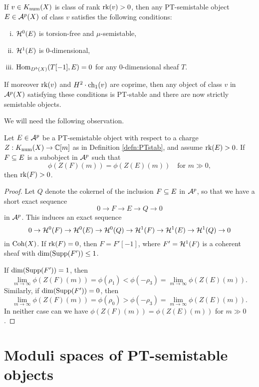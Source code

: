 \begin{prop}
    If $v \in K_{\mathrm{num}}(X)$ is class of rank $\operatorname{\mathrm{rk}}(v) > 0$, then any PT-semistable object $E \in \mathcal{A}^p(X)$ of class $v$ satisfies the following conditions:
    \begin{enumerate}[(i)]
        \item $\mathcal{H}^0(E)$ is torsion-free and $\mu$-semistable,
        \item $\mathcal{H}^1(E)$ is 0-dimensional,
        \item $\mathrm{Hom}_{D^b(X)}(T[-1], E) = 0$ for any 0-dimensional sheaf $T$.
    \end{enumerate}
    If moreover $\operatorname{\mathrm{rk}}(v)$ and $H^2 \cdot \operatorname{\mathrm{ch}}_1(v)$ are coprime, then any object of class $v$ in $\mathcal{A}^p(X)$ satisfying these conditions is PT-stable and there are now strictly semistable objects.
\end{prop}
We will need the following observation.
\begin{lem}\label{subobjposrank}
    Let $E \in \mathcal{A}^p$ be a PT-semistable object with respect to a charge $Z: K_{\mathrm{num}}(X) \to \mathbb{C}[m]$ as in Definition \ref{defn:PTstab}, and assume $\operatorname{\mathrm{rk}}(E) > 0$. If $F \subseteq E$ is a subobject in $\mathcal{A}^p$ such that 
    \[ \phi(Z(F)(m)) = \phi(Z(E)(m)) \quad \text{for } m \gg 0, \]
    then $\operatorname{\mathrm{rk}}(F) > 0$.
\end{lem}
\begin{proof}
    Let $Q$ denote the cokernel of the inclusion $F \subseteq E$ in $\mathcal{A}^p$, so that we have a short exact sequence
    \[ 0 \to F \to E \to Q \to 0 \]
    in $\mathcal{A}^p$. This induces an exact sequence
    \[ 0 \to \mathcal{H}^0(F) \to \mathcal{H}^0(E) \to \mathcal{H}^0(Q) \to \mathcal{H}^1(F) \to \mathcal{H}^1(E) \to \mathcal{H}^1(Q) \to 0 \]
    in $\operatorname{\mathrm{Coh}}(X)$. If $\operatorname{\mathrm{rk}}(F) = 0$, then $F = F'[-1]$, where $F' = \mathcal{H}^1(F)$ is a coherent sheaf with $\dim(\operatorname{\mathrm{Supp}}(F')) \le 1$. 
    
    If $\dim(\operatorname{\mathrm{Supp}}(F')) = 1$, then
    \[ \lim_{m \to \infty} \phi(Z(F)(m)) = \phi(\rho_1) < \phi(-\rho_3) = \lim_{m \to \infty} \phi(Z(E)(m)). \]
    Similarly, if $\dim(\operatorname{\mathrm{Supp}}(F')) = 0$, then
    \[ \lim_{m \to \infty} \phi(Z(F)(m)) = \phi(\rho_0) > \phi(-\rho_3) = \lim_{m \to \infty} \phi(Z(E)(m)). \]
    In neither case can we have $\phi(Z(F)(m)) = \phi(Z(E)(m))$ for $m \gg 0$. 
\end{proof}

\section{Moduli spaces of PT-semistable objects}


